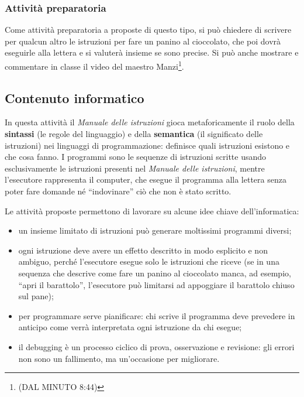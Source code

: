 \subsubsection{Attività preparatoria}

\ruoliattivita{\ruoloProgrammatore\quad\ruoloEsecutore}

Come attività preparatoria a proposte di questo tipo, si può chiedere di scrivere per qualcun altro le istruzioni per fare un panino al cioccolato, che poi dovrà eseguirle alla lettera e si valuterà insieme se sono precise. Si può anche mostrare e commentare in classe il video del maestro Manzi\footnote{ (DAL MINUTO 8:44)}.


\subsection{Contenuto informatico }\label{contenuto-informatico-1}

In questa attività il \emph{Manuale delle istruzioni} gioca metaforicamente il ruolo della \textbf{sintassi} (le regole del linguaggio) e della \textbf{semantica} (il significato delle istruzioni) nei linguaggi di programmazione: definisce quali istruzioni esistono e che cosa fanno. I programmi sono le sequenze di istruzioni scritte usando esclusivamente le istruzioni presenti nel \emph{Manuale delle istruzioni}, mentre l'esecutore rappresenta il computer, che esegue il programma alla lettera senza poter fare domande né ``indovinare'' ciò che non è stato scritto.

Le attività proposte permettono di lavorare su alcune idee chiave dell'informatica:

\begin{itemize}
\item
  un insieme limitato di istruzioni può generare moltissimi programmi diversi;
\item
  ogni istruzione deve avere un effetto descritto in modo esplicito e non ambiguo, perché l'esecutore esegue solo le istruzioni che riceve (se in una sequenza che descrive come fare un panino al cioccolato manca, ad esempio, ``apri il barattolo'', l'esecutore può limitarsi ad appoggiare il barattolo chiuso sul pane);
\item
  per programmare serve pianificare: chi scrive il programma deve prevedere in anticipo come verrà interpretata ogni istruzione da chi esegue;
\item
  il debugging è un processo ciclico di prova, osservazione e revisione: gli errori non sono un fallimento, ma un'occasione per migliorare.
\end{itemize}

